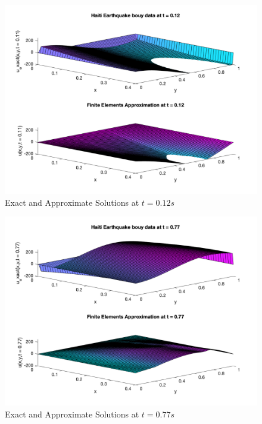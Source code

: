 \documentclass[conf]{new-aiaa}
\begin{document}
\begin{figure}[H]
    \begin{center}
    \includegraphics [width= 1\linewidth]{figures/ExactandApprox_t012.png}
    \caption{Exact and Approximate Solutions at $t=0.12s$}
    \label{fig_t012}
    \end{center}
\end{figure}

\begin{figure}[H]
    \begin{center}
    \includegraphics [width= 1\linewidth]{figures/ExactandApprox_t077.png}
    \caption{Exact and Approximate Solutions at $t=0.77s$}
    \label{fig_t077}
    \end{center}
\end{figure}
\end{document}
